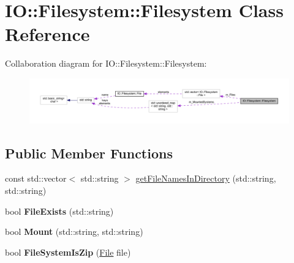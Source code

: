 \hypertarget{class_i_o_1_1_filesystem_1_1_filesystem}{}\section{IO\+:\+:Filesystem\+:\+:Filesystem Class Reference}
\label{class_i_o_1_1_filesystem_1_1_filesystem}


Collaboration diagram for IO\+:\+:Filesystem\+:\+:Filesystem\+:
\nopagebreak
\begin{figure}[H]
\begin{center}
\leavevmode
\includegraphics[width=350pt]{class_i_o_1_1_filesystem_1_1_filesystem__coll__graph}
\end{center}
\end{figure}
\subsection*{Public Member Functions}
\begin{DoxyCompactItemize}
\item 
const std\+::vector$<$ std\+::string $>$ \hyperlink{class_i_o_1_1_filesystem_1_1_filesystem_a08a55eab2acbf4868339d2dee3e861e6}{get\+File\+Names\+In\+Directory} (std\+::string, std\+::string)
\item 
bool {\bfseries File\+Exists} (std\+::string)\hypertarget{class_i_o_1_1_filesystem_1_1_filesystem_a8652e75765bc28f5d5f8da64ae8770f9}{}\label{class_i_o_1_1_filesystem_1_1_filesystem_a8652e75765bc28f5d5f8da64ae8770f9}

\item 
bool {\bfseries Mount} (std\+::string, std\+::string)\hypertarget{class_i_o_1_1_filesystem_1_1_filesystem_a82571e9965f36d7593a383fef2489e64}{}\label{class_i_o_1_1_filesystem_1_1_filesystem_a82571e9965f36d7593a383fef2489e64}

\item 
bool {\bfseries File\+System\+Is\+Zip} (\hyperlink{class_i_o_1_1_filesystem_1_1_file}{File} file)\hypertarget{class_i_o_1_1_filesystem_1_1_filesystem_afe8e55d51bd27cefd17c52ae62be79e6}{}\label{class_i_o_1_1_filesystem_1_1_filesystem_afe8e55d51bd27cefd17c52ae62be79e6}

\end{DoxyCompactItemize}

